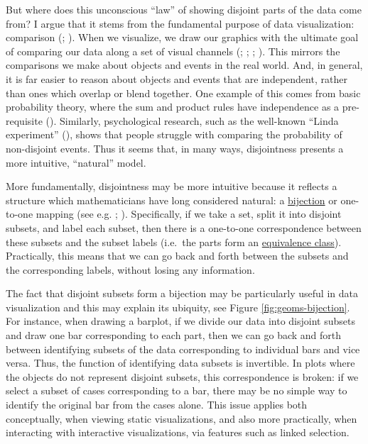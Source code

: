 \documentclass[
]{book}
\theoremstyle{definition}
\theoremstyle{definition}
\theoremstyle{definition}
\theoremstyle{definition}
\theoremstyle{remark}
\begin{document}
But where does this unconscious ``law'' of showing disjoint parts of the data come from? I argue that it stems from the fundamental purpose of data visualization: comparison (; ). When we visualize, we draw our graphics with the ultimate goal of comparing our data along a set of visual channels (; ; ; ). This mirrors the comparisons we make about objects and events in the real world. And, in general, it is far easier to reason about objects and events that are independent, rather than ones which overlap or blend together. One example of this comes from basic probability theory, where the sum and product rules have independence as a pre-requisite (). Similarly, psychological research, such as the well-known ``Linda experiment'' (), shows that people struggle with comparing the probability of non-disjoint events. Thus it seems that, in many ways, disjointness presents a more intuitive, ``natural'' model.

More fundamentally, disjointness may be more intuitive because it reflects a structure which mathematicians have long considered natural: a \hyperref[functions]{bijection} or one-to-one mapping (see e.g. ; ). Specifically, if we take a set, split it into disjoint subsets, and label each subset, then there is a one-to-one correspondence between these subsets and the subset labels (i.e.~the parts form an \hyperref[partition]{equivalence class}). Practically, this means that we can go back and forth between the subsets and the corresponding labels, without losing any information.

The fact that disjoint subsets form a bijection may be particularly useful in data visualization and this may explain its ubiquity, see Figure \ref{fig:geoms-bijection}. For instance, when drawing a barplot, if we divide our data into disjoint subsets and draw one bar corresponding to each part, then we can go back and forth between identifying subsets of the data corresponding to individual bars and vice versa. Thus, the function of identifying data subsets is invertible. In plots where the objects do not represent disjoint subsets, this correspondence is broken: if we select a subset of cases corresponding to a bar, there may be no simple way to identify the original bar from the cases alone. This issue applies both conceptually, when viewing static visualizations, and also more practically, when interacting with interactive visualizations, via features such as linked selection.
\end{document}
